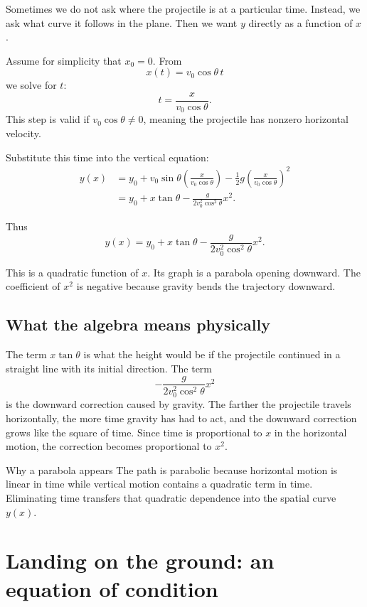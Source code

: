 \documentclass[11pt,a4paper]{article}
\begin{document}
Sometimes we do not ask where the projectile is at a particular time. Instead, we ask what curve it follows in the plane. Then we want $y$ directly as a function of $x$.

Assume for simplicity that $x_0=0$. From
\[
x(t)=v_0\cos\theta\,t
\]
we solve for $t$:
\[
t=\frac{x}{v_0\cos\theta}.
\]
This step is valid if $v_0\cos\theta\ne0$, meaning the projectile has nonzero horizontal velocity.

Substitute this time into the vertical equation:
\begin{align*}
y(x)&=y_0+v_0\sin\theta\left(\frac{x}{v_0\cos\theta}\right)-\frac12g\left(\frac{x}{v_0\cos\theta}\right)^2 \\
&=y_0+x\tan\theta-\frac{g}{2v_0^2\cos^2\theta}x^2.
\end{align*}

Thus
\[
\boxed{y(x)=y_0+x\tan\theta-\frac{g}{2v_0^2\cos^2\theta}x^2.}
\]

This is a quadratic function of $x$. Its graph is a parabola opening downward. The coefficient of $x^2$ is negative because gravity bends the trajectory downward.

\subsection{What the algebra means physically}

The term $x\tan\theta$ is what the height would be if the projectile continued in a straight line with its initial direction. The term
\[
-\frac{g}{2v_0^2\cos^2\theta}x^2
\]
is the downward correction caused by gravity. The farther the projectile travels horizontally, the more time gravity has had to act, and the downward correction grows like the square of time. Since time is proportional to $x$ in the horizontal motion, the correction becomes proportional to $x^2$.

\begin{principlebox}{Why a parabola appears}
The path is parabolic because horizontal motion is linear in time while vertical motion contains a quadratic term in time. Eliminating time transfers that quadratic dependence into the spatial curve $y(x)$.
\end{principlebox}

\newpage

\section{Landing on the ground: an equation of condition}
\end{document}
